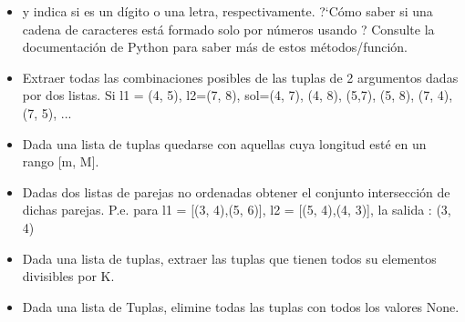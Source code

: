 \begin{itemize}
\item {} y  indica si  es un dígito o una letra, respectivamente. 
?`Cómo saber si una cadena de caracteres está formado solo por números usando ? Consulte la documentación de Python para saber más de estos métodos/función. 

\item Extraer todas las combinaciones posibles de las tuplas de 2 argumentos dadas por dos listas.
Si l1 = (4, 5), l2=(7, 8), sol=(4, 7), (4, 8), (5,7), (5, 8), (7, 4), (7, 5), ...

\item Dada una lista de tuplas quedarse con aquellas cuya longitud esté en un rango [m, M].

\item Dadas dos listas de parejas no ordenadas obtener el conjunto intersección de dichas parejas.
P.e. para l1 = [(3, 4),(5, 6)], l2 = [(5, 4),(4, 3)],  la salida : {(3, 4)}

\item Dada una lista de tuplas, extraer las tuplas que tienen todos su elementos divisibles por K.

\item Dada una lista de Tuplas, elimine todas las tuplas con todos los valores None.
\end{itemize}


